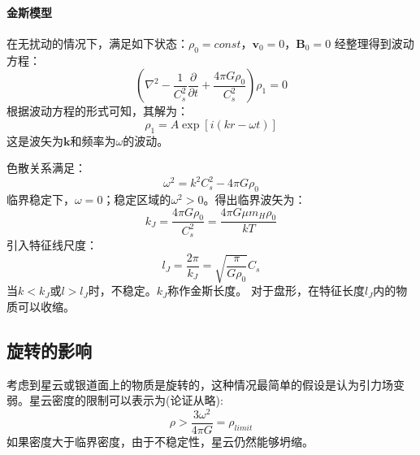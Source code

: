 \paragraph{金斯模型}
在无扰动的情况下，满足如下状态：$\rho_{0}=const$，$\boldsymbol{v}_{0}=0$，$\boldsymbol{B}_{0}=0$
经整理得到波动方程：
\begin{equation}
	\left(\nabla^2-\frac{1}{C_{s}^2}\frac{\partial}{\partial t}+\frac{4\pi G \rho_{0}}{C_{s}^2}\right)\rho_{1}=0
\end{equation}
根据波动方程的形式可知，其解为：
\begin{equation}
	\rho_{1}=A\exp\left[i(kr-\omega t)\right]
\end{equation}
这是波矢为$\boldsymbol{k}$和频率为$\omega$的波动。

色散关系满足：
\begin{equation}
	\omega^2=k^2C_{s}^2-4\pi G\rho_{0}
\end{equation}
临界稳定下，$\omega=0$；稳定区域的$\omega^2>0$。得出临界波矢为：
\begin{equation}
	k_{J}=\frac{4\pi G\rho_{0}}{C_{s}^2}=\frac{4\pi G\mu m_{H}\rho_{0}}{kT}
\end{equation}
引入特征线尺度：
\begin{equation}
	l_{J}=\frac{2\pi}{k_{J}}=\sqrt{\frac{\pi}{G\rho_{0}}}C_{s}
\end{equation}
当$k<k_{J}$或$l>l_{J}$时，不稳定。$k_{J}$称作金斯长度。
对于盘形，在特征长度$l_{J}$内的物质可以收缩。
\subsection{旋转的影响}
考虑到星云或银道面上的物质是旋转的，这种情况最简单的假设是认为引力场变弱。星云密度的限制可以表示为(论证从略):
\begin{equation}
	\rho>\frac{3\omega^2}{4\pi G}=\rho_{limit}
\end{equation}
如果密度大于临界密度，由于不稳定性，星云仍然能够坍缩。
